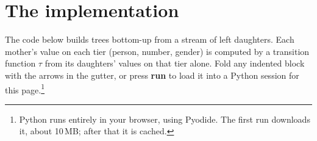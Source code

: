 
\begin{abstract}
A working implementation of the MTSM: a transducer that values each mother node from its two daughters, one feature tier at a time, plus two evaluators that check whether a tree could have been built that way. Every code block on this page can be run in the browser.
\end{abstract}
\label{ch:mtsm}

\section{The implementation}\label{sec:mtsm-code}

The code below builds trees bottom-up from a stream of left daughters. Each mother's value on each tier (person, number, gender) is computed by a transition function $\tau$ from its daughters' values on that tier alone. Fold any indented block with the arrows in the gutter, or press \textbf{run} to load it into a Python session for this page.\footnote{Python runs entirely in your browser, using Pyodide. The first run downloads it, about 10\,MB; after that it is cached.}

